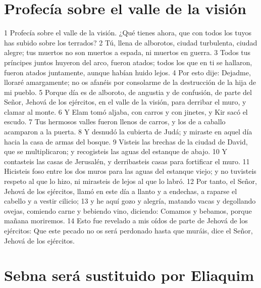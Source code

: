 \section*{Profecía sobre el valle de la visión}

1 Profecía sobre el valle de la visión. ¿Qué tienes ahora, que con todos los tuyos has subido sobre los terrados?
2 Tú, llena de alborotos, ciudad turbulenta, ciudad alegre; tus muertos no son muertos a espada, ni muertos en guerra.
3 Todos tus príncipes juntos huyeron del arco, fueron atados; todos los que en ti se hallaron, fueron atados juntamente, aunque habían huido lejos.
4 Por esto dije: Dejadme, lloraré amargamente; no os afanéis por consolarme de la destrucción de la hija de mi pueblo.
5 Porque día es de alboroto, de angustia y de confusión, de parte del Señor, Jehová de los ejércitos, en el valle de la visión, para derribar el muro, y clamar al monte.
6 Y Elam tomó aljaba, con carros y con jinetes, y Kir sacó el escudo.
7 Tus hermosos valles fueron llenos de carros, y los de a caballo acamparon a la puerta.
8 Y desnudó la cubierta de Judá; y miraste en aquel día hacia la casa de armas del bosque.
9 Visteis las brechas de la ciudad de David, que se multiplicaron; y recogisteis las aguas del estanque de abajo. 
10 Y contasteis las casas de Jerusalén, y derribasteis casas para fortificar el muro.
11 Hicisteis foso entre los dos muros para las aguas del estanque viejo; y no tuvisteis respeto al que lo hizo, ni mirasteis de lejos al que lo labró.
12 Por tanto, el Señor, Jehová de los ejércitos, llamó en este día a llanto y a endechas, a raparse el cabello y a vestir cilicio;
13 y he aquí gozo y alegría, matando vacas y degollando ovejas, comiendo carne y bebiendo vino, diciendo: Comamos y bebamos, porque mañana moriremos. 
14 Esto fue revelado a mis oídos de parte de Jehová de los ejércitos: Que este pecado no os será perdonado hasta que muráis, dice el Señor, Jehová de los ejércitos.

\section*{Sebna será sustituido por Eliaquim}

